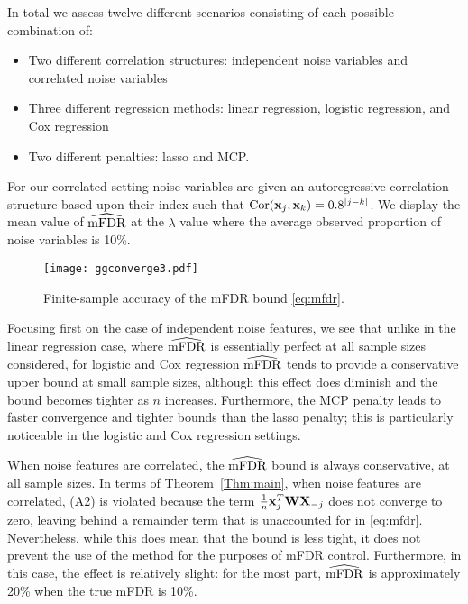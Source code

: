 In total we assess twelve different scenarios consisting of each possible combination of:
\begin{itemize}[leftmargin=*, labelindent=0.5cm]
\item Two different correlation structures: independent noise variables and correlated noise variables
\item Three different regression methods: linear regression, logistic regression, and Cox regression
\item Two different penalties: lasso and MCP. 
\end{itemize}
For our correlated setting noise variables are given an autoregressive correlation structure based upon their index such that $\textrm{Cor}(\mathbf{x}_j,\mathbf{x}_k) = 0.8^{|j - k|}$. We display the mean value of $\widehat{\textrm{mFDR}}$ at the $\lambda$ value where the average observed proportion of noise variables is 10\%.

\begin{figure} [!htb]
 \centering
  \texttt{[image: ggconverge3.pdf]}
  \caption{\label{Fig:converge}Finite-sample accuracy of the mFDR bound \eqref{eq:mfdr}.}
\end{figure}

Focusing first on the case of independent noise features, we see that unlike in the linear regression case, where $\widehat{\textrm{mFDR}}$ is essentially perfect at all sample sizes considered, for logistic and Cox regression $\widehat{\textrm{mFDR}}$ tends to provide a conservative upper bound at small sample sizes, although this effect does diminish and the bound becomes tighter as $n$ increases.
Furthermore, the MCP penalty leads to faster convergence and tighter bounds than the lasso penalty; this is particularly noticeable in the logistic and Cox regression settings.

When noise features are correlated, the $\widehat{\textrm{mFDR}}$ bound is always conservative, at all sample sizes.  In terms of Theorem~\ref{Thm:main}, when noise features are correlated, (A2) is violated because the term $\frac{1}{n}\mathbf{x}_j^T\mathbf{W}\mathbf{X}_{-j}$ does not converge to zero, leaving behind a remainder term that is unaccounted for in \eqref{eq:mfdr}.
Nevertheless, while this does mean that the bound is less tight, it does not prevent the use of the method for the purposes of mFDR control.
Furthermore, in this case, the effect is relatively slight: for the most part, $\widehat{\textrm{mFDR}}$ is approximately 20\% when the true mFDR is 10\%.

